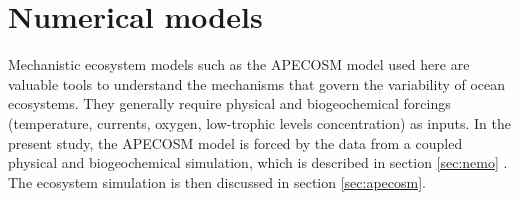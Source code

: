 
\section{Numerical models}
\label{sec:model-des}

Mechanistic ecosystem models such as the APECOSM model used here are valuable tools to understand the mechanisms that govern the variability of ocean ecosystems. They generally require physical and biogeochemical forcings (temperature, currents, oxygen, low-trophic levels concentration) as inputs. In the present study, the APECOSM model is forced by the data from a coupled physical and biogeochemical simulation, which is described in section \ref{sec:nemo} . The ecosystem simulation is then discussed in section \ref{sec:apecosm}.





